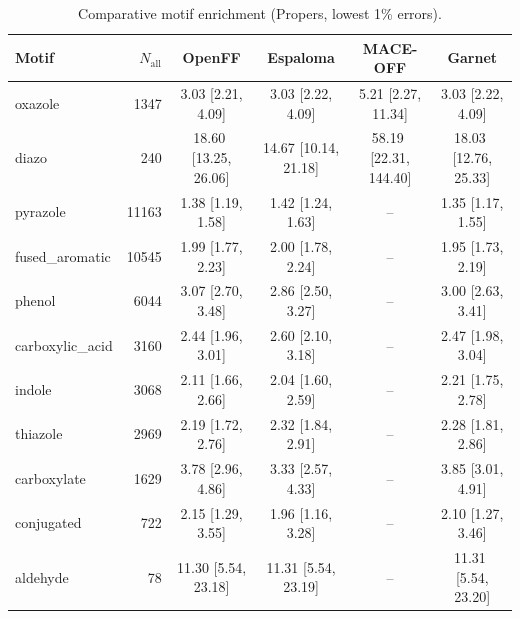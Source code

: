 \begin{table}[h!]
  \centering
  \small
  \setlength{\tabcolsep}{5pt}
  \renewcommand{\arraystretch}{1.15}
  \begin{tabular}{l r c c c c}
    \hline
    Motif & $N_\mathrm{all}$ & OpenFF & Espaloma & MACE-OFF & Garnet \\
    \hline
    oxazole & 1347 & 3.03\,\,[2.21, 4.09] & 3.03\,\,[2.22, 4.09] & 5.21\,\,[2.27, 11.34] & 3.03\,\,[2.22, 4.09] \\
    diazo & 240 & 18.60\,\,[13.25, 26.06] & 14.67\,\,[10.14, 21.18] & 58.19\,\,[22.31, 144.40] & 18.03\,\,[12.76, 25.33] \\
    \hdashline
    pyrazole & 11163 & 1.38\,\,[1.19, 1.58] & 1.42\,\,[1.24, 1.63] & -- & 1.35\,\,[1.17, 1.55] \\
    fused\_aromatic & 10545 & 1.99\,\,[1.77, 2.23] & 2.00\,\,[1.78, 2.24] & -- & 1.95\,\,[1.73, 2.19] \\
    phenol & 6044 & 3.07\,\,[2.70, 3.48] & 2.86\,\,[2.50, 3.27] & -- & 3.00\,\,[2.63, 3.41] \\
    carboxylic\_acid & 3160 & 2.44\,\,[1.96, 3.01] & 2.60\,\,[2.10, 3.18] & -- & 2.47\,\,[1.98, 3.04] \\
    indole & 3068 & 2.11\,\,[1.66, 2.66] & 2.04\,\,[1.60, 2.59] & -- & 2.21\,\,[1.75, 2.78] \\
    thiazole & 2969 & 2.19\,\,[1.72, 2.76] & 2.32\,\,[1.84, 2.91] & -- & 2.28\,\,[1.81, 2.86] \\
    carboxylate & 1629 & 3.78\,\,[2.96, 4.86] & 3.33\,\,[2.57, 4.33] & -- & 3.85\,\,[3.01, 4.91] \\
    conjugated & 722 & 2.15\,\,[1.29, 3.55] & 1.96\,\,[1.16, 3.28] & -- & 2.10\,\,[1.27, 3.46] \\
    aldehyde & 78 & 11.30\,\,[5.54, 23.18] & 11.31\,\,[5.54, 23.19] & -- & 11.31\,\,[5.54, 23.20] \\
    \hline
  \end{tabular}
  \caption{Comparative motif enrichment (Propers, lowest 1\% errors).}
  \label{tab:compare_propers_best}
\end{table}